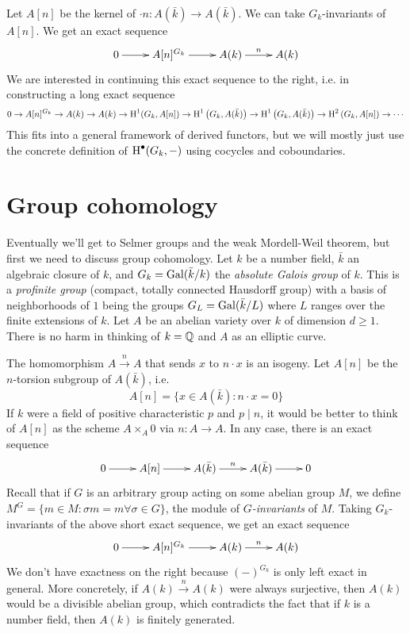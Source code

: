 \documentclass{article}
\begin{document}
Let $A[n]$ be the kernel of $\cdot n : A(\bar k)\to A(\bar k)$. We can take 
$G_k$-invariants of $A[n]$. We get an exact sequence 
\[\xymatrix{
  0 \ar[r] 
    & A[n]^{G_k} \ar[r] 
    & A(k) \ar[r]^-n 
    & A(k)
}\]
We are interested in continuing this exact sequence to the right, i.e. in 
constructing a long exact sequence 
\[
  0 \to A[n]^{G_k} \to A(k) \to A(k) \to \operatorname{H}^1(G_k,A[n]) \to \operatorname{H}^1\left(G_k,A(\bar k)\right)\to \operatorname{H}^1\left(G_k, A(\bar k)\right) \to \operatorname{H}^2\left(G_k, A[n]\right) \to \cdots
\]
This fits into a general framework of derived functors, but we will mostly 
just use the concrete definition of $\operatorname{H}^\bullet(G_k,-)$ using cocycles and 
coboundaries. 










\section{Group cohomology}

Eventually we'll get to Selmer groups and the weak Mordell-Weil theorem, but 
first we need to discuss group cohomology. Let $k$ be a number field, $\bar k$ 
an algebraic closure of $k$, and $G_k=\operatorname{Gal}(\bar k/k)$ the \emph{absolute Galois 
group} of $k$. This is a \emph{profinite group} (compact, totally connected 
Hausdorff group) with a basis of neighborhoods of $1$ being the groups 
$G_L=\operatorname{Gal}(\bar k/L)$ where $L$ ranges over the finite extensions of $k$. Let 
$A$ be an abelian variety over $k$ of dimension $d\geqslant 1$. There is no 
harm in thinking of $k=\mathbb{Q}$ and $A$ as an elliptic curve. 

The homomorphism $A\xrightarrow n A$ that sends $x$ to $n\cdot x$ is an 
isogeny. Let $A[n]$ be the $n$-torsion subgroup of $A(\bar k)$, i.e. 
\[
  A[n] = \{x\in A(\bar k) : n\cdot x = 0\}
\]
If $k$ were a field of positive characteristic $p$ and $p\mid n$, it would be 
better to think of $A[n]$ as the scheme $A\times_A 0$ via $n:A\to A$. In any 
case, there is an exact sequence 
\[\xymatrix{
  0 \ar[r] 
    & A[n] \ar[r] 
    & A(\bar k) \ar[r]^-n 
    & A(\bar k) \ar[r] 
    & 0
}\]
Recall that if $G$ is an arbitrary group acting on some abelian group $M$, we 
define $M^G=\{m\in M:\sigma m = m\forall \sigma\in G\}$, the module of 
\emph{$G$-invariants} of $M$. Taking $G_k$-invariants of the above short exact 
sequence, we get an exact sequence 
\[\xymatrix{
  0 \ar[r] 
    & A[n]^{G_k} \ar[r] 
    & A(k) \ar[r]^-n 
    & A(k)
}\]
We don't have exactness on the right because $(-)^{G_k}$ is only left exact in 
general. More concretely, if $A(k)\xrightarrow n A(k)$ were always surjective, 
then $A(k)$ would be a divisible abelian group, which contradicts the fact that 
if $k$ is a number field, then $A(k)$ is finitely generated. 
\end{document}
